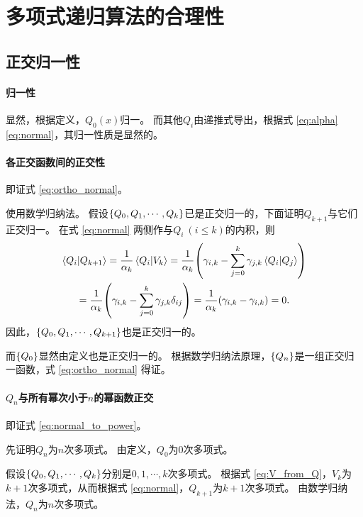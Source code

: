 \documentclass[a4paper,unicode]{report}
\begin{document}
\section{多项式递归算法的合理性}
\subsection{正交归一性}
\paragraph{归一性}
显然，根据定义，$Q_0(x)$归一。
而其他$Q_i$由递推式导出，根据式 \eqref{eq:alpha} \eqref{eq:normal}，其归一性质是显然的。

\paragraph{各正交函数间的正交性}
即证式 \eqref{eq:ortho_normal}。

使用数学归纳法。
假设$\qty{Q_{0},Q_1,\cdots,Q_k}$已是正交归一的，下面证明$Q_{k+1}$与它们正交归一。
在式 \eqref{eq:normal} 两侧作与$Q_i\ (i \le k)$的内积，则
\begin{multline}
    \braket{Q_i}{Q_{k+1}}
    = \frac{1}{\alpha_k}\braket{Q_i}{V_k}
    = \frac{1}{\alpha_k}\qty(\gamma_{i, k} - \sum_{j=0}^k \gamma_{j,k} \braket{Q_i}{Q_j}) \\
    = \frac{1}{\alpha_k}\qty(\gamma_{i, k} - \sum_{j=0}^k \gamma_{j,k} \delta_{ij})
    = \frac{1}{\alpha_k}\qty(\gamma_{i, k} - \gamma_{i,k}) = 0.
\end{multline}
因此，$\qty{Q_{0},Q_1,\cdots,Q_{k+1}}$也是正交归一的。

而$\qty{Q_{0}}$显然由定义也是正交归一的。
根据数学归纳法原理，$\qty{Q_n}$是一组正交归一函数，式 \eqref{eq:ortho_normal} 得证。

\paragraph{\texorpdfstring{$Q_n$}{Q_n}与所有幂次小于\texorpdfstring{$n$}{n}的幂函数正交}
即证式 \eqref{eq:normal_to_power}。

先证明$Q_n$为$n$次多项式。
由定义，$Q_0$为$0$次多项式。

假设$\qty{Q_{0},Q_1,\cdots,Q_k}$分别是$0,1,\cdots,k$次多项式。
根据式 \eqref{eq:V_from_Q}，$V_k$为$k+1$次多项式，从而根据式 \eqref{eq:normal}，$Q_{k+1}$为$k+1$次多项式。
由数学归纳法，$Q_n$为$n$次多项式。
\end{document}
